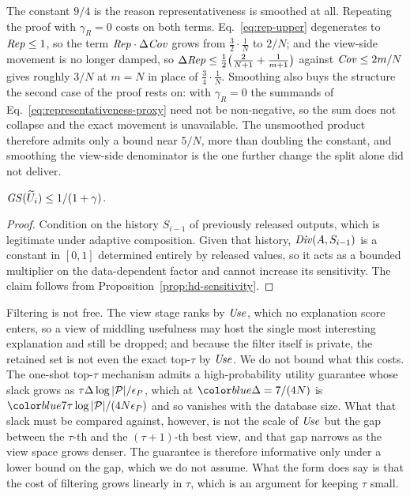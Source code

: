 The constant $9/4$ is the reason representativeness is smoothed at all.
Repeating the proof with $\gamma_R=0$ costs on both terms.
Eq.~\eqref{eq:rep-upper} degenerates to $\mathit{Rep}\le1$, so the term $\mathit{Rep}\cdot\Delta\mathit{Cov}$ grows from $\tfrac32\cdot\tfrac1N$ to $2/N$; and the view-side movement is no longer damped, so $\Delta\mathit{Rep}\le\tfrac12\big(\tfrac{2}{N+1}+\tfrac1{m+1}\big)$ against $\mathit{Cov}\le2m/N$ gives roughly $3/N$ at $m=N$ in place of $\tfrac34\cdot\tfrac1N$.
Smoothing also buys the structure the second case of the proof rests on: with $\gamma_R=0$ the summands of Eq.~\eqref{eq:representativeness-proxy} need not be non-negative, so the sum does not collapse and the exact movement is unavailable.
The unsmoothed product therefore admits only a bound near $5/N$, more than doubling the constant, and smoothing the view-side denominator is the one further change the split alone did not deliver.

\begin{proposition}
\label{prop:selection-utility-sensitivity}
$\mathit{GS}(\widetilde{U}_i)\le 1/(1+\gamma)$.
\end{proposition}

\begin{proof}
Condition on the history $S_{i-1}$ of previously released outputs, which is legitimate under adaptive composition.
Given that history, $\mathit{Div}(A,S_{i-1})$ is a constant in $[0,1]$ determined entirely by released values, so it acts as a bounded multiplier on the data-dependent factor and cannot increase its sensitivity.
The claim follows from Proposition~\ref{prop:hd-sensitivity}.
\end{proof}

Filtering is not free.
The view stage ranks by $\mathit{Use}$, which no explanation score enters, so a view of middling usefulness may host the single most interesting explanation and still be dropped; and because the filter itself is private, the retained set is not even the exact top-$\tau$ by $\mathit{Use}$.
We do not bound what this costs.
The one-shot top-$\tau$ mechanism admits a high-probability utility guarantee whose slack grows as $\tau\Delta\log|\mathcal{P}|/\epsilon_P$, which at $\added{\Delta=7/(4N)}$ is $\added{7\tau\log|\views|/(4N\epsilon_P)}$ and so vanishes with the database size.
What that slack must be compared against, however, is not the scale of $\mathit{Use}$ but the gap between the $\tau$-th and the $(\tau{+}1)$-th best view, and that gap narrows as the view space grows denser.
The guarantee is therefore informative only under a lower bound on the gap, which we do not assume.
What the form does say is that the cost of filtering grows linearly in $\tau$, which is an argument for keeping $\tau$ small.